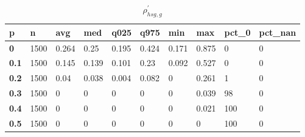\begin{table}[h]
 \centering 
\footnotesize
\caption{$\rho_{hsg,g}^\prime $}
\label{tab:alphahsgg}
\begin{tabular}[h]{|l|l|l|l|l|l|l|l|l|l|
    } \hline
\textbf{ p} & \textbf{ n} & \textbf{ avg} & \textbf{ med} & \textbf{ q025} & \textbf{ q975} & \textbf{ min} & \textbf{ max} & \textbf{ pct\_0} & \textbf{ pct\_nan}
    \\ \hline
  \textbf{  0} & 1500 & 0.264 &  0.25 & 0.195 & 0.424 & 0.171 & 0.875 &   0 & 0
    \\ \hline
  \textbf{0.1} & 1500 & 0.145 & 0.139 & 0.101 &  0.23 & 0.092 & 0.527 &   0 & 0
    \\ \hline
  \textbf{0.2} & 1500 &  0.04 & 0.038 & 0.004 & 0.082 &     0 & 0.261 &   1 & 0
    \\ \hline
  \textbf{0.3} & 1500 &     0 &     0 &     0 &     0 &     0 & 0.039 &  98 & 0
    \\ \hline
  \textbf{0.4} & 1500 &     0 &     0 &     0 &     0 &     0 & 0.021 & 100 & 0
    \\ \hline
  \textbf{0.5} & 1500 &     0 &     0 &     0 &     0 &     0 &     0 & 100 & 0
    \\ \hline
 \end{tabular}
 \end{table}
